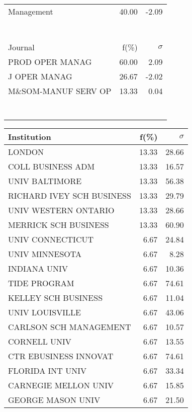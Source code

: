 \documentclass[a4paper,11pt]{report}
\begin{document}
\begin{landscape}
\begin{table}[!ht]
{\begin{tabular}{|l r  r|}
Management & 40.00 & -2.09\\
 &  & \\
 &  & \\
 &  & \\
 &  & \\
 &  & \\
 &  & \\
 &  & \\
\hline
\hline
Journal & f(\%) & $\sigma$\\
\hline
PROD OPER MANAG & 60.00 & 2.09\\
J OPER MANAG & 26.67 & -2.02\\
M\&SOM-MANUF SERV OP & 13.33 & 0.04\\
 &  & \\
 &  & \\
 &  & \\
 &  & \\
 &  & \\
 &  & \\
 &  & \\
\hline
\end{tabular}
}
{\scriptsize\begin{tabular}{|l r r|}
\hline
Institution & f(\%) & $\sigma$\\
\hline
LONDON & 13.33 & 28.66\\
COLL BUSINESS ADM & 13.33 & 16.57\\
UNIV BALTIMORE & 13.33 & 56.38\\
RICHARD IVEY SCH BUSINESS & 13.33 & 29.79\\
UNIV WESTERN ONTARIO & 13.33 & 28.66\\
MERRICK SCH BUSINESS & 13.33 & 60.90\\
UNIV CONNECTICUT & 6.67 & 24.84\\
UNIV MINNESOTA & 6.67 & 8.28\\
INDIANA UNIV & 6.67 & 10.36\\
TIDE PROGRAM & 6.67 & 74.61\\
KELLEY SCH BUSINESS & 6.67 & 11.04\\
UNIV LOUISVILLE & 6.67 & 43.06\\
CARLSON SCH MANAGEMENT & 6.67 & 10.57\\
CORNELL UNIV & 6.67 & 13.55\\
CTR EBUSINESS INNOVAT & 6.67 & 74.61\\
FLORIDA INT UNIV & 6.67 & 33.34\\
CARNEGIE MELLON UNIV & 6.67 & 15.85\\
GEORGE MASON UNIV & 6.67 & 21.50\\

\end{tabular}}
\end{table}
\end{landscape}
\end{document}
